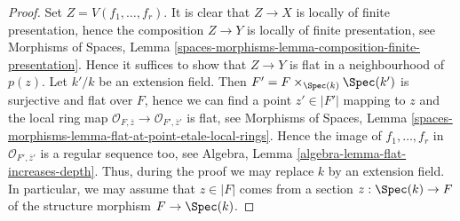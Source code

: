 \begin{proof}
Set $Z = V(f_1, \ldots, f_r)$. It is clear that $Z \to X$ is locally of
finite presentation, hence the composition $Z \to Y$ is locally of finite
presentation, see
Morphisms of Spaces,
Lemma \ref{spaces-morphisms-lemma-composition-finite-presentation}.
Hence it suffices to show that $Z \to Y$ is flat in a neighbourhood of $p(z)$.
Let $k'/k$ be an extension field. Then
$F' = F \times_{\Spec(k)} \Spec(k')$ is surjective and
flat over $F$, hence we can find a point $z' \in |F'|$ mapping to $z$
and the local ring map
$\mathcal{O}_{F, \overline{z}} \to \mathcal{O}_{F', \overline{z}'}$ is
flat, see
Morphisms of Spaces,
Lemma \ref{spaces-morphisms-lemma-flat-at-point-etale-local-rings}.
Hence the image of $f_1, \ldots, f_r$ in
$\mathcal{O}_{F', \overline{z}'}$ is a regular sequence too, see
Algebra, Lemma \ref{algebra-lemma-flat-increases-depth}.
Thus, during the proof we may replace $k$ by an extension field.
In particular, we may assume that $z \in |F|$ comes from a section
$z : \Spec(k) \to F$ of the structure morphism $F \to \Spec(k)$.


\end{proof}
